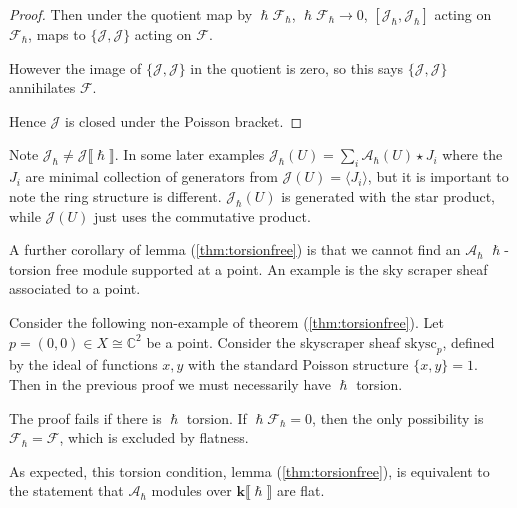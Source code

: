 \begin{proof}
    Then under the quotient map by \( \hslash \mathcal{F}_{\hslash}\),  \(\hslash \mathcal{F}_\hslash \rightarrow 0\), \( [\mathcal{J}_{\hslash} ,\mathcal{J}_{\hslash}]\) acting on \( \mathcal{F}_{\hslash}\), maps to \( \{\mathcal{J},\mathcal{J}\} \) acting on \( \mathcal{F}\). 
    
    However the image of \(\{\mathcal{J},\mathcal{J}\}\) in the quotient is zero, so this says  \(\{\mathcal{J},\mathcal{J}\}\) annihilates \( \mathcal{F}\).

    Hence \( \mathcal{J} \) is closed under the Poisson bracket.
    \end{proof}
    
    \begin{rem}
    Note \( \mathcal{J}_{\hslash} \neq \mathcal{J}\lBrack \hslash \rBrack\). In some later examples \( \mathcal{J}_{\hslash}(U) =  \sum_i \mathcal{A}_{\hslash}(U) \star  J_i \) where the \(J_i\) are minimal collection of generators from \(\mathcal{J}(U) = \langle J_i\rangle  \), but it is important to note the ring structure is different. \( \mathcal{J}_{\hslash}(U)\) is generated with the star product, while \( \mathcal{J}(U)\) just uses the commutative product.
    \end{rem}
    
    
    
    A further corollary of lemma (\ref{thm:torsionfree}) is that we cannot find an \( \mathcal{A}_\hslash \) \(\hslash \)-torsion free module supported at a point. An example is the sky scraper sheaf associated to a point.

    \begin{ex}Consider the following non-example of theorem (\ref{thm:torsionfree}). Let \( p = (0,0) \in X \cong \mathbb{C}^2 \) be a point. Consider the skyscraper sheaf \( \mathrm{skysc}_p \), defined by  the ideal of functions \( x,y\) with the standard Poisson structure \( \{ x,y \} = 1\). Then in the previous proof we must necessarily have \( \hslash \) torsion.
    \end{ex}

    
    The proof fails if there is \( \hslash\) torsion. If \( \hslash \mathcal{F}_{\hslash} = 0\), then the only possibility is \( \mathcal{F}_{\hslash} = \mathcal{F}\), which is excluded by flatness.
    
    As expected, this torsion condition, lemma (\ref{thm:torsionfree}), is equivalent to the statement that \( \mathcal{A}_{\hslash}\) modules over \( \mathbf{k}\lBrack \hslash \rBrack \) are flat.
    
